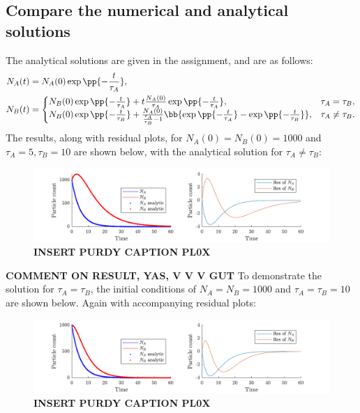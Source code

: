 \documentclass[a4paper,10pt]{article} 	%
\numberwithin{equation}{section}
\begin{document}
	\subsection{Compare the numerical and analytical solutions}
	The analytical solutions are given in the assignment, and are as follows:
	\begin{align}
		N_A(t) &= N_A(0) \exp\pp{-\frac{t}{\tau_A}}, \\
		N_B(t) &= \begin{cases}
		N_B(0) \exp\pp{-\frac{t}{\tau_A}} + t \frac{N_A(0)}{\tau_A} \exp\pp{-\frac{t}{\tau_A}}, & \tau_A= \tau_B, \\
		N_B(0) \exp\pp{-\frac{t}{\tau_B}} + \frac{N_A(0)}{\frac{\tau_A}{\tau_B} - 1} \bb{\exp\pp{-\frac{t}{\tau_A}} - \exp\pp{-\frac{t}{\tau_B}}}, & \tau_A \neq \tau_B.
		\end{cases}
	\end{align}	
	The results, along with residual plots, for $ N_A(0) = N_B(0) = 1000 $ and $ \tau_A = 5, \tau_B = 10 $ are shown below, with the analytical solution for $ \tau_A \neq \tau_B $:
	\begin{figure}[H]
		\centering
		\includegraphics[width=\linewidth]{unequaltau.pdf}
		\caption{\textbf{INSERT PURDY CAPTION PL0X}}
		\label{fig:unequalTau}
	\end{figure}
\textbf{COMMENT ON RESULT, YAS, V V V GUT}
	To demonstrate the solution for $ \tau_A = \tau_B $, the initial conditions of $ N_A=N_B = 1000 $ and $ \tau_A=\tau_B = 10 $ are shown below. Again with accompanying residual plots:
	\begin{figure}[H]
		\centering
		\includegraphics[width=\linewidth]{equaltau.pdf}
		\caption{\textbf{INSERT PURDY CAPTION PL0X}}
		\label{fig:equalTau}
	\end{figure}
	
\end{document}

